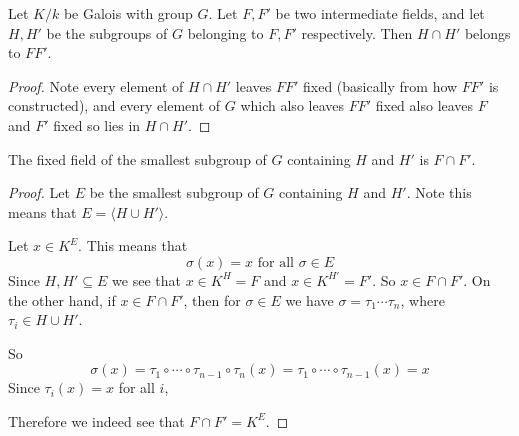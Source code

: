 \begin{corollary}
    Let $K/k$ be Galois with group $G$. Let $F,F'$ be two intermediate fields, and let $H,H'$ be the subgroups of $G$ belonging to $F,F'$ respectively. Then $H\cap H'$ belongs to $FF'$.
    \begin{proof}
        Note every element of $H\cap H'$ leaves $FF'$ fixed (basically from how $FF'$ is constructed), and every element of $G$ which also leaves $FF'$ fixed also leaves $F$ and $F'$ fixed so lies in $H\cap H'$.
    \end{proof}
\end{corollary}

\begin{corollary}
    The fixed field of the smallest subgroup of $G$ containing $H$ and $H'$ is $F\cap F'$.
    \begin{proof}
        Let $E$ be the smallest subgroup of $G$ containing $H$ and $H'$. Note this means that $E = \langle H\cup H' \rangle$. 
        
        Let $x\in K^E$. This means that \[\sigma(x) = x \text{ for all }\sigma\in E\]
        Since $H,H'\subseteq E$ we see that $x\in K^H = F$ and $x\in K^{H'} = F'$. So $x\in F\cap F'$. On the other hand, if $x\in F\cap F'$, then for $\sigma\in E$ we have $\sigma = \tau_1\cdots \tau_n$, where $\tau_i\in H\cup H'$.

        So \[\sigma(x) = \tau_1\circ\cdots \circ \tau_{n-1}\circ \tau_n(x) = \tau_1\circ\cdots \circ \tau_{n-1}(x) = x\] Since $\tau_i(x) =x$ for all $i$,

        Therefore we indeed see that $F\cap F' = K^E$.

    \end{proof} 
\end{corollary}

